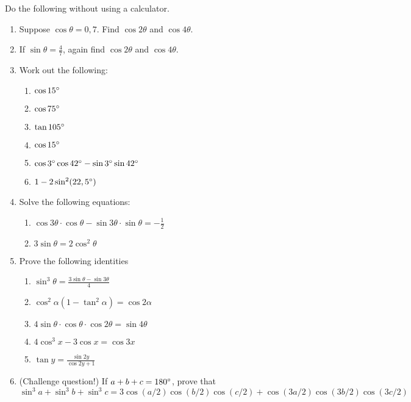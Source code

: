 \begin{eocexercises}{}
Do the following without using a calculator.
\begin{enumerate}
\item Suppose $\cos\theta=0,7$. Find $\cos 2\theta$ and $\cos 4\theta$.
\item If $\sin\theta=\frac{4}{7}$, again find $\cos 2\theta$ and $\cos 4\theta$.
\item Work out the following:
\begin{enumerate}
\item $\cos 15^{\circ}$
\item $\cos 75^{\circ}$
\item $\tan 105^{\circ}$
\item $\cos 15^{\circ}$
\item $\cos 3^{\circ} \cos 42^{\circ} -\sin 3^{\circ} \sin 42^{\circ}$
\item $1-2 \sin^2 (22,5^{\circ})$
\end{enumerate}
\item Solve the following equations:
\begin{enumerate}
\item $\cos 3\theta\cdot\cos\theta-\sin 3\theta\cdot\sin\theta=-\frac{1}{2}$
\item $3\sin \theta=2\cos^2\theta$

\end{enumerate}
\item Prove the following identities
\begin{enumerate}
\item $\sin^3\theta=\frac{3\sin\theta-\sin 3\theta}{4}$
\item $\cos^2\alpha (1-\tan^2\alpha)=\cos 2\alpha$
\item $4\sin\theta\cdot\cos\theta\cdot\cos 2\theta= \sin 4\theta$
\item $4\cos^3 x -3\cos x=\cos 3x$
\item $\tan y=\frac{\sin 2y}{\cos 2y+1}$
\end{enumerate}
\item (Challenge question!) If $a+b+c=180^{\circ}$, prove that 
$$\sin^3 a+\sin^3 b+ \sin^3 c = 3\cos(a/2)\cos(b/2)\cos(c/2)+ \cos(3a/2)\cos(3b/2)\cos(3c/2)$$

\end{enumerate}









\practiceinfo
\end{eocexercises}
